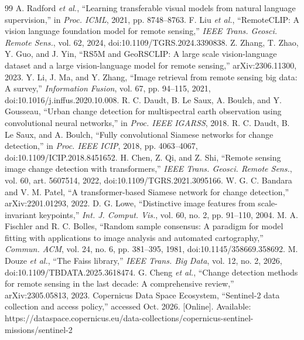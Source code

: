 \documentclass[conference,a4paper]{IEEEtran}
\begin{document}
\begin{thebibliography}{99}
 A. Radford \emph{et al.}, ``Learning transferable visual models from natural language supervision,'' in \emph{Proc. ICML}, 2021, pp. 8748--8763.
 F. Liu \emph{et al.}, ``RemoteCLIP: A vision language foundation model for remote sensing,'' \emph{IEEE Trans. Geosci. Remote Sens.}, vol. 62, 2024, doi:10.1109/TGRS.2024.3390838.
 Z. Zhang, T. Zhao, Y. Guo, and J. Yin, ``RS5M and GeoRSCLIP: A large scale vision-language dataset and a large vision-language model for remote sensing,'' arXiv:2306.11300, 2023.
 Y. Li, J. Ma, and Y. Zhang, ``Image retrieval from remote sensing big data: A survey,'' \emph{Information Fusion}, vol. 67, pp. 94--115, 2021, doi:10.1016/j.inffus.2020.10.008.
 R. C. Daudt, B. Le Saux, A. Boulch, and Y. Gousseau, ``Urban change detection for multispectral earth observation using convolutional neural networks,'' in \emph{Proc. IEEE IGARSS}, 2018.
 R. C. Daudt, B. Le Saux, and A. Boulch, ``Fully convolutional Siamese networks for change detection,'' in \emph{Proc. IEEE ICIP}, 2018, pp. 4063--4067, doi:10.1109/ICIP.2018.8451652.
 H. Chen, Z. Qi, and Z. Shi, ``Remote sensing image change detection with transformers,'' \emph{IEEE Trans. Geosci. Remote Sens.}, vol. 60, art. 5607514, 2022, doi:10.1109/TGRS.2021.3095166.
 W. G. C. Bandara and V. M. Patel, ``A transformer-based Siamese network for change detection,'' arXiv:2201.01293, 2022.
 D. G. Lowe, ``Distinctive image features from scale-invariant keypoints,'' \emph{Int. J. Comput. Vis.}, vol. 60, no. 2, pp. 91--110, 2004.
 M. A. Fischler and R. C. Bolles, ``Random sample consensus: A paradigm for model fitting with applications to image analysis and automated cartography,'' \emph{Commun. ACM}, vol. 24, no. 6, pp. 381--395, 1981, doi:10.1145/358669.358692.
 M. Douze \emph{et al.}, ``The Faiss library,'' \emph{IEEE Trans. Big Data}, vol. 12, no. 2, 2026, doi:10.1109/TBDATA.2025.3618474.
 G. Cheng \emph{et al.}, ``Change detection methods for remote sensing in the last decade: A comprehensive review,'' arXiv:2305.05813, 2023.
 Copernicus Data Space Ecosystem, ``Sentinel-2 data collection and access policy,'' accessed Oct. 2026. [Online]. Available: https://dataspace.copernicus.eu/data-collections/copernicus-sentinel-missions/sentinel-2
\end{thebibliography}
\end{document}
